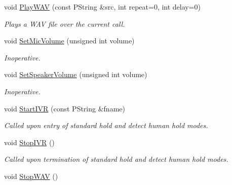 \begin{CompactItemize}
void \hyperlink{classTeleKarma_ca737d1deeb1da27f12d84f8c4b6819b}{PlayWAV} (const PString \&src, int repeat=0, int delay=0)
\begin{CompactList}\small\item\em Plays a WAV file over the current call. \item\end{CompactList}\item 
void \hyperlink{classTeleKarma_ecc8d8bd546be13afb320151a0c5014b}{SetMicVolume} (unsigned int volume)
\begin{CompactList}\small\item\em Inoperative. \item\end{CompactList}\item 
void \hyperlink{classTeleKarma_3b434ca4effe173e19b9334da432a79f}{SetSpeakerVolume} (unsigned int volume)
\begin{CompactList}\small\item\em Inoperative. \item\end{CompactList}\item 
void \hyperlink{classTeleKarma_e7fa2e0e51af227908ddf46de42732f2}{StartIVR} (const PString \&fname)
\begin{CompactList}\small\item\em Called upon entry of standard hold and detect human hold modes. \item\end{CompactList}\item 
void \hyperlink{classTeleKarma_9b93b7a0b3af465d07a5facaa445344f}{StopIVR} ()
\begin{CompactList}\small\item\em Called upon termination of standard hold and detect human hold modes. \item\end{CompactList}\item 
\hypertarget{classTeleKarma_9f928ce40bb1f6663772e07022783b7a}{
void \hyperlink{classTeleKarma_9f928ce40bb1f6663772e07022783b7a}{StopWAV} ()}
\label{classTeleKarma_9f928ce40bb1f6663772e07022783b7a}


\end{CompactItemize}
